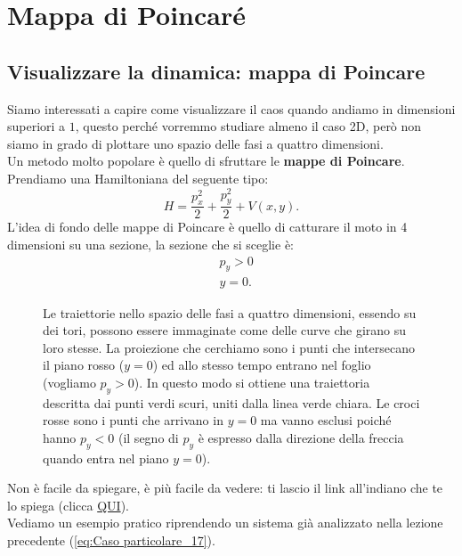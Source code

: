 \section{Mappa di Poincaré}%
\label{sub:Lezione 18}
\mylocaltoc
\subsection{Visualizzare la dinamica: mappa di Poincare}%
\label{sub:Visualizzare la dinamica: mappa di Poincare}
Siamo interessati a capire come visualizzare il caos quando andiamo in dimensioni superiori a $1$, questo perché vorremmo studiare almeno il caso 2D, però non siamo in grado di plottare uno spazio delle fasi a quattro dimensioni. \\
Un metodo molto popolare è quello di sfruttare le \textbf{mappe di Poincare}.\\
Prendiamo una Hamiltoniana del seguente tipo:
\[
    H = \frac{p_x^2}{2}+\frac{p_y^2}{2} + V(x, y)
.\] 
L'idea di fondo delle mappe di Poincare è quello di catturare il moto in 4 dimensioni su una sezione, la sezione che si sceglie è:
\[\begin{aligned}
    & p_y>0\\
    & y=0
.\end{aligned}\]
\begin{figure}[H]
    \centering
    \caption{\scriptsize Le traiettorie nello spazio delle fasi a quattro dimensioni, essendo su dei tori, possono essere immaginate come delle curve che girano su loro stesse. La proiezione che cerchiamo sono i punti che intersecano il piano rosso ($y=0$) ed allo stesso tempo entrano nel foglio (vogliamo $p_y>0$). In questo modo si ottiene una traiettoria descritta dai punti verdi scuri, uniti dalla linea verde chiara. Le croci rosse sono i punti che arrivano in $y=0$ ma vanno esclusi poiché hanno $p_y<0$ (il segno di $p_y$ è espresso dalla direzione della freccia quando entra nel piano $y=0$).}
    \label{fig:18_flux_line}
\end{figure}
\noindent
Non è facile da spiegare, è più facile da vedere: ti lascio il link all'indiano che te lo spiega (clicca \href{https://www.youtube.com/watch?v=PR5Ds5iS3Ow}{QUI}).\\
Vediamo un esempio pratico riprendendo un sistema già analizzato nella lezione precedente (\ref{eq:Caso particolare_17}).
